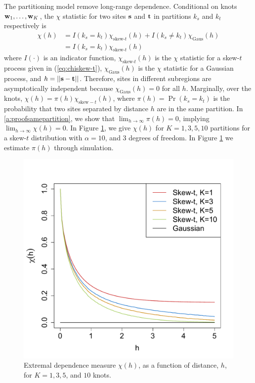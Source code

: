 \documentclass[useAMS,usenatbib,referee]{biom}
\begin{document}
The partitioning model remove long-range dependence. Conditional on knots $\mbox{\bf w}_1, \ldots, \mbox{\bf w}_K$, the $\chi$ statistic for two sites $\mbox{\bf s}$ and $\mbox{\bf t}$ in partitions $k_s$ and $k_t$ respectively is
\begin{align}
  \chi(h) &= I(k_s = k_t) \chi_{\text{skew-}t}(h) + I(k_s \neq k_t) \chi_{\text{Gaus}}(h) \nonumber \\
         &= I(k_s = k_t) \chi_{\text{skew-}t}(h)
\end{align}
where $I(\cdot)$ is an indicator function, $\chi_{\text{skew-}t}(h)$ is the $\chi$ statistic for a skew-$t$ process given in (\ref{eq:chiskew-t}), $\chi_{\text{Gaus}}(h)$ is the $\chi$ statistic for a Gaussian process, and $h = ||\mbox{\bf s} - \mbox{\bf t}||$.
Therefore, sites in different subregions are asymptotically independent because $\chi_{\text{Gaus}}(h) = 0$ for all $h$.
Marginally, over the knots, $\chi(h) = \pi(h) \chi_{\text{skew}-t}(h)$, where $\pi(h) = \Pr(k_s = k_t)$ is the probability that two sites separated by distance $h$ are in the same partition.
In \ref{a:proofsamepartition}, we show that $\lim_{h \rightarrow \infty} \pi(h) = 0$, implying $\lim_{h \rightarrow \infty} \chi(h) = 0$.
In Figure \ref{fig:chi}, we give $\chi(h)$ for $K = 1, 3, 5, 10$ partitions for a skew-$t$ distribution with $\alpha = 10$, and 3 degrees of freedom.
In Figure \ref{fig:chi} we estimate $\pi(h)$ through simulation.

\begin{figure}
  \centering
  \includegraphics[width=0.5\linewidth]{plots/chi-h.pdf}
  \caption{Extremal dependence measure $\chi(h)$, as a function of distance, $h$, for $K = 1, 3, 5$, and $10$ knots.}
  \label{fig:chi}
\end{figure}
\end{document}
